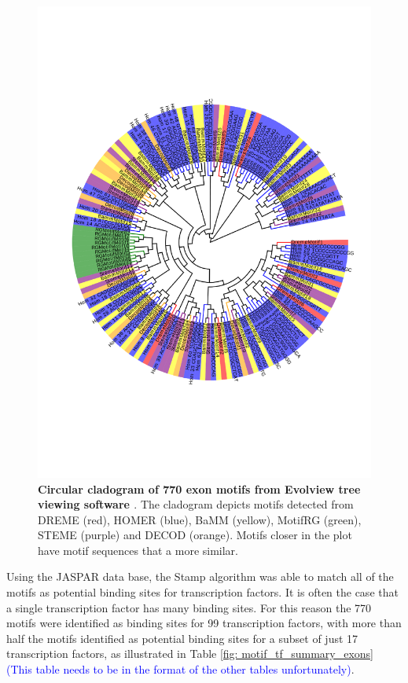 \documentclass[12pt]{article}
\begin{document}
\begin{figure}[htbp] 
     \includegraphics[width= \textwidth]{exon_pilot_cardiogram.pdf} 
    \caption{{\bf Circular cladogram of 770 exon motifs from Evolview tree viewing software \citep{He2016} }. 
    The cladogram depicts motifs detected from DREME (red), HOMER (blue), BaMM (yellow), MotifRG (green), STEME (purple)
    and DECOD (orange). Motifs closer in the plot have motif sequences that a more similar.}
    \label{fig: exon_cladogram}
\end{figure}

Using the JASPAR data base, the Stamp algorithm was able to match all of the motifs as potential binding sites for transcription factors. It is often the case that a single transcription factor has many binding sites. For this reason the 770 motifs were identified as binding sites for 99 transcription factors, with more than half the motifs identified as potential binding sites for a subset of just 17 transcription factors, as illustrated in Table \ref{fig: motif_tf_summary_exons} \textcolor{blue}{(This table needs to be in the format of the other tables unfortunately)}. 
\end{document}
